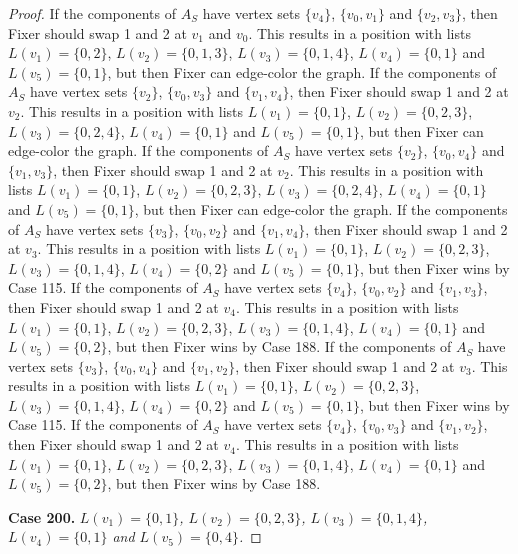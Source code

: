 \documentclass[12pt]{amsart}
\theoremstyle{plain}
\theoremstyle{definition}
\theoremstyle{remark}
\begin{document}
\begin{proof}
If the components of $A_S$ have vertex sets $\{v_4\}$, $\{v_0, v_1\}$ and $\{v_2, v_3\}$, then Fixer should swap 1 and 2 at $v_1$ and $v_0$. This results in a position with lists $L(v_1) = \{0, 2\}$, $L(v_2) = \{0, 1, 3\}$, $L(v_3) = \{0, 1, 4\}$, $L(v_4) = \{0, 1\}$ and $L(v_5) = \{0, 1\}$, but then Fixer can edge-color the graph.
If the components of $A_S$ have vertex sets $\{v_2\}$, $\{v_0, v_3\}$ and $\{v_1, v_4\}$, then Fixer should swap 1 and 2 at $v_2$. This results in a position with lists $L(v_1) = \{0, 1\}$, $L(v_2) = \{0, 2, 3\}$, $L(v_3) = \{0, 2, 4\}$, $L(v_4) = \{0, 1\}$ and $L(v_5) = \{0, 1\}$, but then Fixer can edge-color the graph.
If the components of $A_S$ have vertex sets $\{v_2\}$, $\{v_0, v_4\}$ and $\{v_1, v_3\}$, then Fixer should swap 1 and 2 at $v_2$. This results in a position with lists $L(v_1) = \{0, 1\}$, $L(v_2) = \{0, 2, 3\}$, $L(v_3) = \{0, 2, 4\}$, $L(v_4) = \{0, 1\}$ and $L(v_5) = \{0, 1\}$, but then Fixer can edge-color the graph.
If the components of $A_S$ have vertex sets $\{v_3\}$, $\{v_0, v_2\}$ and $\{v_1, v_4\}$, then Fixer should swap 1 and 2 at $v_3$. This results in a position with lists $L(v_1) = \{0, 1\}$, $L(v_2) = \{0, 2, 3\}$, $L(v_3) = \{0, 1, 4\}$, $L(v_4) = \{0, 2\}$ and $L(v_5) = \{0, 1\}$, but then Fixer wins by Case 115.
If the components of $A_S$ have vertex sets $\{v_4\}$, $\{v_0, v_2\}$ and $\{v_1, v_3\}$, then Fixer should swap 1 and 2 at $v_4$. This results in a position with lists $L(v_1) = \{0, 1\}$, $L(v_2) = \{0, 2, 3\}$, $L(v_3) = \{0, 1, 4\}$, $L(v_4) = \{0, 1\}$ and $L(v_5) = \{0, 2\}$, but then Fixer wins by Case 188.
If the components of $A_S$ have vertex sets $\{v_3\}$, $\{v_0, v_4\}$ and $\{v_1, v_2\}$, then Fixer should swap 1 and 2 at $v_3$. This results in a position with lists $L(v_1) = \{0, 1\}$, $L(v_2) = \{0, 2, 3\}$, $L(v_3) = \{0, 1, 4\}$, $L(v_4) = \{0, 2\}$ and $L(v_5) = \{0, 1\}$, but then Fixer wins by Case 115.
If the components of $A_S$ have vertex sets $\{v_4\}$, $\{v_0, v_3\}$ and $\{v_1, v_2\}$, then Fixer should swap 1 and 2 at $v_4$. This results in a position with lists $L(v_1) = \{0, 1\}$, $L(v_2) = \{0, 2, 3\}$, $L(v_3) = \{0, 1, 4\}$, $L(v_4) = \{0, 1\}$ and $L(v_5) = \{0, 2\}$, but then Fixer wins by Case 188.

\noindent\textbf{Case 200.  }\textit{$L(v_1) = \{0, 1\}$, $L(v_2) = \{0, 2, 3\}$, $L(v_3) = \{0, 1, 4\}$, $L(v_4) = \{0, 1\}$ and $L(v_5) = \{0, 4\}$.}


\end{proof}
\end{document}
